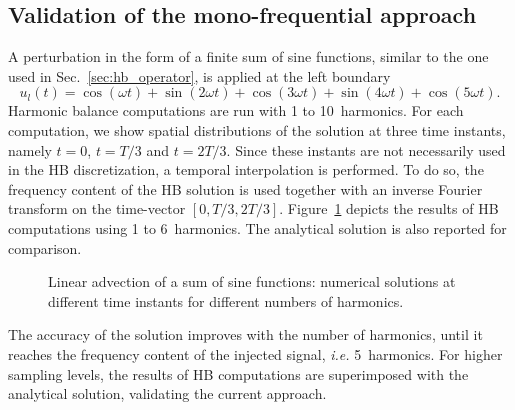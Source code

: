\subsection{Validation of the mono-frequential approach}
\label{sec:sum_sine}

A perturbation 
in the form of a finite sum of sine functions, similar to the one used
in Sec.~\ref{sec:hb_operator},
is applied at the left boundary
\begin{equation}
    u_l(t) = \cos(\omega t) + \sin(2 \omega t) +
    \cos(3 \omega t) + \sin(4 \omega t) + \cos(5 \omega t).
    \label{eq:sum_injected_fct}
\end{equation}
Harmonic balance computations are run with 1 to 10~harmonics.
For each computation, we show spatial distributions of the solution
at three time instants, namely $t=0$, $t=T/3$ and $t=2T/3$.
Since these instants are not necessarily used in the HB discretization,
a temporal interpolation is performed.
To do so, the frequency content of the HB solution is used
together with an inverse Fourier transform on the time-vector
$[0, T/3, 2T/3]$.
Figure~\ref{fig:inj_sine_results} depicts the results of HB computations
using 1 to 6~harmonics. The analytical solution is also reported for comparison.

\begin{figure}[htp]
  \centering
  \caption{Linear advection of a sum of sine functions: 
  numerical solutions at different time instants for different numbers of harmonics.}
  \label{fig:inj_sine_results}
\end{figure}

The accuracy of the solution 
improves with the number of harmonics,
until it reaches the frequency content
of the injected signal, \emph{i.e.} 5~harmonics.
For higher sampling levels, the results of HB computations are
superimposed with the analytical solution, validating the current approach.

